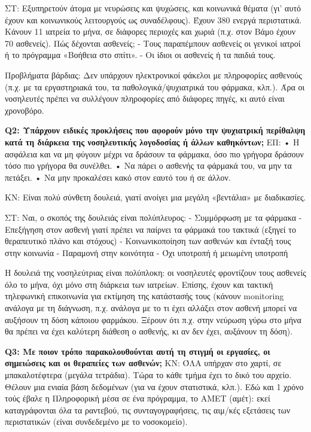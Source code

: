 ΣΤ: Εξυπηρετούν άτομα με νευρώσεις και ψυχώσεις, και κοινωνικά θέματα (γι’ αυτό έχουν και κοινωνικούς λειτουργούς ως συναδέλφους). Έχουν 380 ενεργά περιστατικά. Κάνουν 11 ιατρεία το μήνα, σε διάφορες περιοχές και χωριά (π.χ. στον Βάμο έχουν 70 ασθενείς).
Πώς δέχονται ασθενείς;
-	Τους παραπέμπουν ασθενείς οι γενικοί ιατροί ή το πρόγραμμα «Βοήθεια στο σπίτι».
-	Οι ίδιοι οι ασθενείς ή τα παιδιά τους.

Προβλήματα βάρδιας:
Δεν υπάρχουν ηλεκτρονικοί φάκελοι με πληροφορίες ασθενούς (π.χ. με τα εργαστηριακά του, τα παθολογικά/ψυχιατρικά του φάρμακα, κλπ.). Άρα οι νοσηλευτές πρέπει να συλλέγουν πληροφορίες από διάφορες πηγές, κι αυτό είναι χρονοβόρο.



\textbf{Q2:	Υπάρχουν ειδικές προκλήσεις που αφορούν μόνο την ψυχιατρική περίθαλψη κατά τη διάρκεια της νοσηλευτικής λογοδοσίας ή άλλων καθηκόντων;}
ΕΠ:
• Η ασφάλεια και να μη φύγουν μέχρι να δράσουν τα φάρμακα, όσο πιο γρήγορα δράσουν τόσο πιο γρήγορα θα συνέλθει.
• Να πάρει ο ασθενής τα φάρμακά του, να μην τα πετάξει.
• Να μην προκαλέσει κακό στον εαυτό του ή σε άλλον.

KN: Είναι πολύ σύνθετη δουλειά, γιατί ανοίγει μια μεγάλη «βεντάλια» με διαδικασίες.

ΣΤ: Ναι, ο σκοπός της δουλειάς είναι πολύπλευρος:
-	Συμμόρφωση με τα φάρμακα
-	Επεξήγηση στον ασθενή γιατί πρέπει να παίρνει τα φάρμακά του τακτικά (εξηγεί το θεραπευτικό πλάνο και στόχους)
-	Κοινωνικοποίηση των ασθενών και ένταξή τους στην κοινωνία
-	Παραμονή στην κοινότητα
-	Όχι υποτροπή ή μειωμένη υποτροπή

Η δουλειά της νοσηλεύτριας είναι πολύπλοκη: οι νοσηλευτές φροντίζουν τους ασθενείς όλο το μήνα, όχι μόνο στη διάρκεια των ιατρείων. Επίσης, έχουν και τακτική τηλεφωνική επικοινωνία για εκτίμηση της κατάστασής τους (κάνουν monitoring ανάλογα με τη διάγνωση, π.χ. ανάλογα με το τι έχει αλλάξει στον ασθενή μπορεί να αυξήσουν τη δόση κάποιου φαρμάκου. Ξέρουν ότι π.χ. στην νεύρωση γύρω στο μήνα θα πρέπει να έχει καλύτερη διάθεση ο ασθενής, κι αν δεν έχει, αυξάνουν τη δόση).


\textbf{Q3:	Με ποιον τρόπο παρακολουθούνται αυτή τη στιγμή οι εργασίες, οι σημειώσεις και οι θεραπείες των ασθενών;}
KN: ΌΛΑ υπήρχαν στο χαρτί, σε μπακαλοτέφτερα (μεγάλα τετράδια). Τώρα το κάθε τμήμα έχει το δικό του αρχείο. Θέλουν μια ενιαία βάση δεδομένων (για να έχουν στατιστικά, κλπ.). Εδώ και 1 χρόνο τούς έβαλε η Πληροφορική μέσα σε ένα πρόγραμμα, το ΑΜΕΤ (αμέτ): εκεί καταγράφονται όλα τα ραντεβού, τις συνταγογραφήσεις, τις αιμ/κές εξετάσεις των περιστατικών (είναι συνδεδεμένο με το νοσοκομείο).

